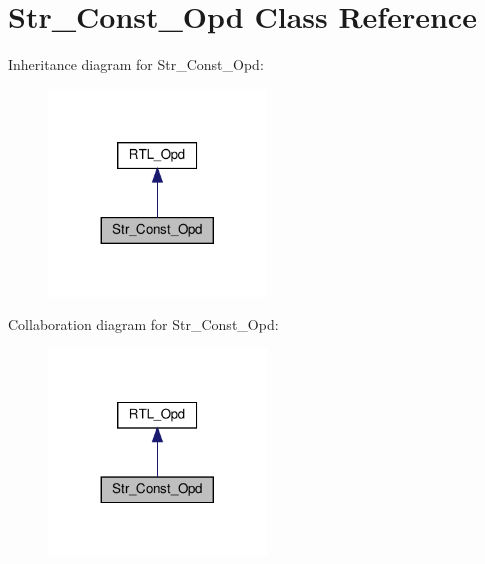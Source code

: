 \hypertarget{classStr__Const__Opd}{}\section{Str\+\_\+\+Const\+\_\+\+Opd Class Reference}
\label{classStr__Const__Opd}


Inheritance diagram for Str\+\_\+\+Const\+\_\+\+Opd\+:
\nopagebreak
\begin{figure}[H]
\begin{center}
\leavevmode
\includegraphics[width=164pt]{classStr__Const__Opd__inherit__graph}
\end{center}
\end{figure}


Collaboration diagram for Str\+\_\+\+Const\+\_\+\+Opd\+:
\nopagebreak
\begin{figure}[H]
\begin{center}
\leavevmode
\includegraphics[width=164pt]{classStr__Const__Opd__coll__graph}
\end{center}
\end{figure}
